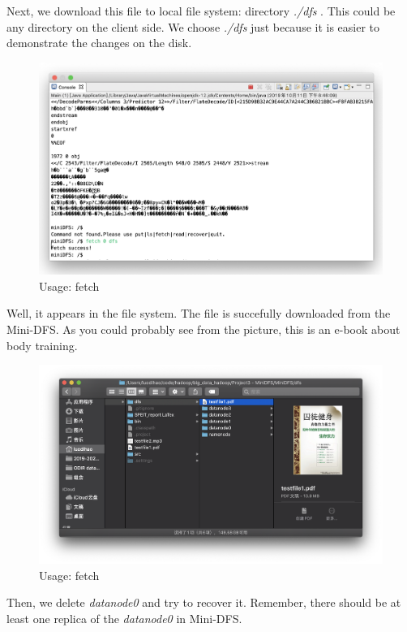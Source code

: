 \documentclass[10pt]{article}
\begin{document}
Next, we download this file to local file system: directory \textit{./dfs} .
This could be any directory on the client side. We choose \textit{./dfs} just because 
it is easier to demonstrate the changes on the disk.

\begin{figure}[H]
\centerline{\includegraphics[width = 1\textwidth]{screenshot//fetch_01.png}}
\caption{Usage: fetch}
\end{figure}

Well, it appears in the file system. The file is succefully downloaded from the Mini-DFS. 
As you could probably see from the picture, this is an e-book about body training.

\begin{figure}[H]
\centerline{\includegraphics[width = 1\textwidth]{screenshot//fetch_02.png}}
\caption{Usage: fetch}
\end{figure}

Then, we delete \textit{datanode0} and try to recover it. Remember, there should be at least 
one replica of the \textit{datanode0} in Mini-DFS.
\end{document}
